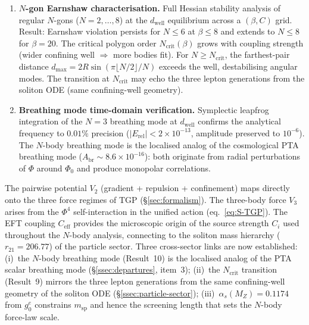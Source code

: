 \begin{enumerate}[nosep]
  \item \textbf{$N$-gon Earnshaw characterisation.}
        Full Hessian stability analysis of regular $N$-gons
        ($N=2,\ldots,8$) at the $d_{\mathrm{well}}$ equilibrium
        across a $(\beta,C)$ grid.  Result: Earnshaw violation
        persists for $N \leq 6$ at $\beta \leq 8$ and extends to
        $N \leq 8$ for $\beta = 20$.  The critical polygon order
        $N_{\mathrm{crit}}(\beta)$ grows with coupling strength
        (wider confining well $\Rightarrow$ more bodies fit).
        For $N \geq N_{\mathrm{crit}}$, the farthest-pair distance
        $d_{\max}=2R\sin(\pi\lfloor N/2\rfloor/N)$ exceeds the
        well, destabilising angular modes.  The transition at
        $N_{\mathrm{crit}}$ may echo the three lepton generations
        from the soliton ODE (same confining-well geometry).

  \item \textbf{Breathing mode time-domain verification.}
        Symplectic leapfrog integration of the $N=3$ breathing mode
        at $d_{\mathrm{well}}$ confirms the analytical frequency to
        $0.01\%$ precision ($|E_{\mathrm{rel}}|<2\times 10^{-13}$,
        amplitude preserved to $10^{-6}$).  The $N$-body breathing
        mode is the localised analog of the cosmological PTA
        breathing mode ($A_{\mathrm{br}}\sim 8.6\times 10^{-16}$):
        both originate from radial perturbations of $\Phi$ around
        $\Phi_{0}$ and produce monopolar correlations.
\end{enumerate}

\begin{remark}\label{rem:nbody-connection}
The pairwise potential $V_{2}$ (gradient + repulsion + confinement)
maps directly onto the three force regimes of TGP
(\S\ref{sec:formalism}).  The three-body force $V_{3}$ arises from
the $\Phi^{4}$ self-interaction in the unified action
(eq.~\ref{eq:S-TGP}).  The EFT coupling $C_{\mathrm{eff}}$
provides the microscopic origin of the source strength $C_{i}$
used throughout the $N$-body analysis, connecting to the soliton
mass hierarchy ($r_{21}=206.77$) of the particle sector.
Three cross-sector links are now established:
(i)~the $N$-body breathing mode (Result~10) is the localised
analog of the PTA scalar breathing mode
(\S\ref{ssec:departures}, item~3);
(ii)~the $N_{\mathrm{crit}}$ transition (Result~9) mirrors the
three lepton generations from the same confining-well geometry
of the soliton ODE (\S\ref{ssec:particle-sector});
(iii)~$\alpha_{s}(M_{Z})=0.1174$ from $g_{0}^{e}$ constrains
$m_{\mathrm{sp}}$ and hence the screening length that sets the
$N$-body force-law scale.
\end{remark}

